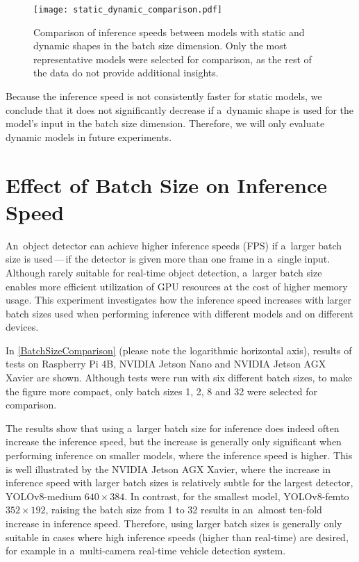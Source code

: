 \begin{figure}[t]
        \centering
        \texttt{[image: static\_dynamic\_comparison.pdf]}
        \caption{Comparison of inference speeds between models with static and
        dynamic shapes in the batch size dimension. Only the most representative
        models were selected for comparison, as the rest of the data do not
        provide additional insights.}
        \label{StaticDynamicModelShape}
\end{figure}

Because the inference speed is not consistently faster for static models, we
conclude that it does not significantly decrease if a~dynamic shape is used for
the model's input in the batch size dimension. Therefore, we will only evaluate
dynamic models in future experiments.


\section{Effect of Batch Size on Inference Speed}
\label{BatchSizeComparisonSection}

An~object detector can achieve higher inference speeds (FPS) if a~larger batch
size is used\,---\,if the detector is given more than one frame in a~single
input. Although rarely suitable for real-time object detection, a~larger batch
size enables more efficient utilization of GPU resources at the cost of higher
memory usage. This experiment investigates how the inference speed increases
with larger batch sizes used when performing inference with different models and
on different devices.

In \autoref{BatchSizeComparison} (please note the logarithmic horizontal axis),
results of tests on Raspberry Pi 4B, NVIDIA Jetson Nano and NVIDIA Jetson AGX
Xavier are shown. Although tests were run with six different batch sizes, to
make the figure more compact, only batch sizes 1, 2, 8 and 32 were selected for
comparison.

The results show that using a~larger batch size for inference does indeed often
increase the inference speed, but the increase is generally only significant
when performing inference on smaller models, where the inference speed is
higher. This is well illustrated by the NVIDIA Jetson AGX Xavier, where the
increase in inference speed with larger batch sizes is relatively subtle for the
largest detector, YOLOv8-medium $640 \times 384$. In contrast, for the smallest
model, YOLOv8-femto $352 \times 192$, raising the batch size from 1 to 32
results in an~almost ten-fold increase in inference speed. Therefore, using
larger batch sizes is generally only suitable in cases where high inference
speeds (higher than real-time) are desired, for example in a~multi-camera
real-time vehicle detection system.


